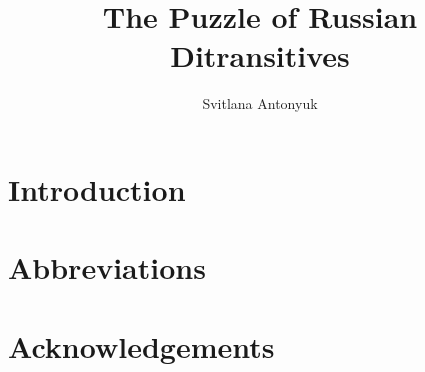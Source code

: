 \documentclass[output=paper]{langsci/langscibook}
\author{Svitlana Antonyuk	\affiliation{}}
\title{The Puzzle of Russian Ditransitives}
\begin{document}
\section{Introduction}  
 
\section*{Abbreviations}
\section*{Acknowledgements}

\sloppy
\printbibliography[heading=subbibliography,notkeyword=this] 
\end{document}
